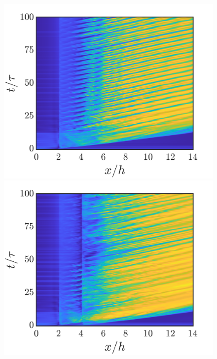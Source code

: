 \documentclass[reprint,a4paper,fleqn]{cas-dc} %
\begin{document}
\begin{figure}[t]
\begin{minipage}[c]{0.24\linewidth}
				\includegraphics[width=1\linewidth,trim={1.6cm 2cm 2cm 1cm},clip]{Figures/MI_HL/spcaeTime_M_Singlec.png}
				\includegraphics[width=1\linewidth,trim={1.6cm 2cm 2cm 1cm},clip]{Figures/MI_HL/spcaeTime_M_4c.png}

\end{minipage}
\end{figure}
\end{document}

